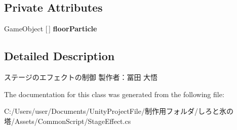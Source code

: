 \subsection*{Private Attributes}
\begin{DoxyCompactItemize}
\item 
\mbox{\label{class_stage_effect_a418eef8dc27dda0b053183b20f1c07f3}} 
Game\+Object \mbox{[}$\,$\mbox{]} {\bfseries floor\+Particle}
\end{DoxyCompactItemize}


\subsection{Detailed Description}
ステージのエフェクトの制御 製作者：冨田 大悟 



The documentation for this class was generated from the following file\+:\begin{DoxyCompactItemize}
\item 
C\+:/\+Users/user/\+Documents/\+Unity\+Project\+File/制作用フォルダ/しろと氷の塔/\+Assets/\+Common\+Script/Stage\+Effect.\+cs\end{DoxyCompactItemize}
